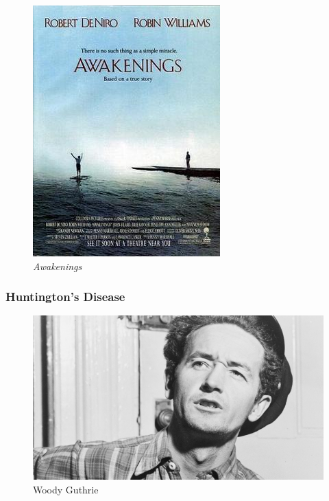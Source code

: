 \documentclass[
  letterpaper,
  DIV=11,
  numbers=noendperiod]{scrartcl}
\begin{document}
\begin{figure}[H]

{\centering \includegraphics{action_files/mediabag/Awakenings.jpg}

}

\caption{\emph{Awakenings}}

\end{figure}%

\subsubsection{Huntington's Disease}\label{huntingtons-disease}

\begin{figure}[H]

{\centering \includegraphics{action_files/mediabag/1000509261001_173382.jpg}

}

\caption{Woody Guthrie}

\end{figure}%
\end{document}

